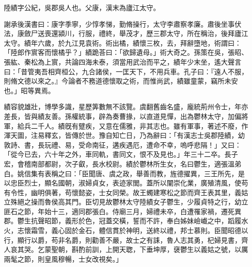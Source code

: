 
\begin{pinyinscope}
陸績字公紀，吳郡吳人也。父康，漢末為廬江太守。

謝承後漢書曰：康字季寧，少惇孝悌，勤脩操行，太守李肅察孝廉。肅後坐事伏法，康斂尸送喪還潁川，行服，禮終，舉茂才，歷三郡太守，所在稱治，後拜廬江太守。績年六歲，於九江見袁術。術出橘，績懷三枚，去，拜辭墮地，術謂曰：「陸郎作賔客而懷橘乎？」績跪荅曰：「欲歸遺母。」術大奇之。孫策在吳，張昭、張紘、秦松為上賔，共論四海未泰，須當用武治而平之，績年少末坐，遙大聲言曰：「昔管夷吾相齊桓公，九合諸侯，一匡天下，不用兵車。孔子曰：『遠人不服，則脩文德以來之。』今論者不務道德懷取之術，而惟尚武，績雖童蒙，竊所未安也。」昭等異焉。

績容貌雄壯，博學多識，星歷筭數無不該覽。虞翻舊齒名盛，龐統荊州令士，年亦差長，皆與績友善。孫權統事，辟為奏曹掾，以直道見憚，出為鬱林太守，加偏將軍，給兵二千人。績旣有躄疾，又意在儒雅，非其志也。雖有軍事，著述不廢，作渾天圖，注易釋玄，皆傳於世。豫自知亡日，乃為辭曰：「有漢志士吳郡陸績，幼敦詩、書，長玩禮、易，受命南征，遘疾遇厄，遭命不幸，嗚呼悲隔！」又曰：「從今已去，六十年之外，車同軌，書同文，恨不及見也。」年三十二卒。長子宏，會稽南部都尉，次子叡，長水校尉。績於鬱林所生女，名曰鬱生，適張溫弟白。姚信集有表稱之曰：「臣聞唐、虞之政，舉善而教，旌德擢異，三王所先，是以忠臣烈士，顯名國朝，淑婦貞女，表迹家閭。蓋所以闡崇化業，廣殖清風，使苟有令性，幽明俱著，苟懷懿姿，士女同榮。故王蠋建寒松之節而齊王表其里，義姑立殊絕之操而魯侯高其門。臣切見故鬱林太守陸績女子鬱生，少履貞特之行，幼立匪石之節，年始十三，適同郡張白。侍廟三月，婦禮未卒，白遭罹家禍，遷死異郡。鬱生抗聲昭節，義形於色，冠蓋交橫，誓而不許，奉白姊妹嶮巇之中，蹈履水火，志懷霜雪，義心固於金石，體信貫於神明，送終以禮，邦士慕則。臣聞昭德以行，顯行以爵，苟非名爵，則勸善不嚴，故士之有誄，魯人志其勇，杞婦見書，齊人哀其哭。乞蒙聖朝，斟酌前訓，上開天聦，下垂坤厚，襃鬱生以義姑之號，以厲兩髦之節，則皇風穆暢，士女改視矣。」


\end{pinyinscope}